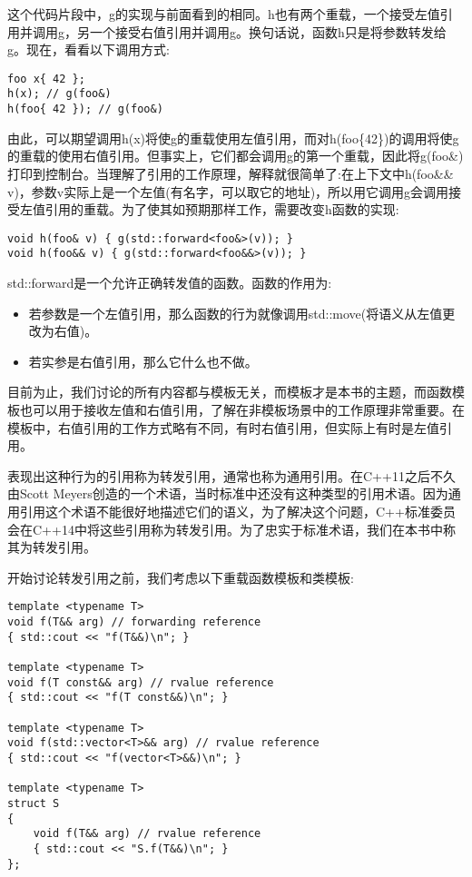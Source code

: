 这个代码片段中，g的实现与前面看到的相同。h也有两个重载，一个接受左值引用并调用g，另一个接受右值引用并调用g。换句话说，函数h只是将参数转发给g。现在，看看以下调用方式:

\begin{lstlisting}[style=styleCXX]
foo x{ 42 };
h(x); // g(foo&)
h(foo{ 42 }); // g(foo&)
\end{lstlisting}

由此，可以期望调用h(x)将使g的重载使用左值引用，而对h(foo\{42\})的调用将使g的重载的使用右值引用。但事实上，它们都会调用g的第一个重载，因此将g(foo\&)打印到控制台。当理解了引用的工作原理，解释就很简单了:在上下文中h(foo\&\& v)，参数v实际上是一个左值(有名字，可以取它的地址)，所以用它调用g会调用接受左值引用的重载。为了使其如预期那样工作，需要改变h函数的实现:

\begin{lstlisting}[style=styleCXX]
void h(foo& v) { g(std::forward<foo&>(v)); }
void h(foo&& v) { g(std::forward<foo&&>(v)); }
\end{lstlisting}

std::forward是一个允许正确转发值的函数。函数的作用为:

\begin{itemize}
\item
若参数是一个左值引用，那么函数的行为就像调用std::move(将语义从左值更改为右值)。

\item
若实参是右值引用，那么它什么也不做。
\end{itemize}

目前为止，我们讨论的所有内容都与模板无关，而模板才是本书的主题，而函数模板也可以用于接收左值和右值引用，了解在非模板场景中的工作原理非常重要。在模板中，右值引用的工作方式略有不同，有时右值引用，但实际上有时是左值引用。

表现出这种行为的引用称为转发引用，通常也称为通用引用。在C++11之后不久由Scott Meyers创造的一个术语，当时标准中还没有这种类型的引用术语。因为通用引用这个术语不能很好地描述它们的语义，为了解决这个问题，C++标准委员会在C++14中将这些引用称为转发引用。为了忠实于标准术语，我们在本书中称其为转发引用。

开始讨论转发引用之前，我们考虑以下重载函数模板和类模板:

\begin{lstlisting}[style=styleCXX]
template <typename T>
void f(T&& arg) // forwarding reference
{ std::cout << "f(T&&)\n"; }

template <typename T>
void f(T const&& arg) // rvalue reference
{ std::cout << "f(T const&&)\n"; }

template <typename T>
void f(std::vector<T>&& arg) // rvalue reference
{ std::cout << "f(vector<T>&&)\n"; }

template <typename T>
struct S
{
	void f(T&& arg) // rvalue reference
	{ std::cout << "S.f(T&&)\n"; }
};
\end{lstlisting}

